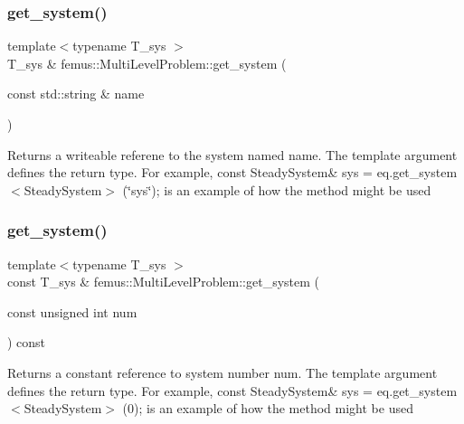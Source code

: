 \subsubsection{\texorpdfstring{get\+\_\+system()}{get\_system()}\hspace{0.1cm}{\footnotesize\ttfamily [2/8]}}
{\footnotesize\ttfamily template$<$typename T\+\_\+sys $>$ \\
T\+\_\+sys \& femus\+::\+Multi\+Level\+Problem\+::get\+\_\+system (\begin{DoxyParamCaption}\item[{const std\+::string \&}]{name }\end{DoxyParamCaption})\hspace{0.3cm}{\ttfamily [inline]}}

\begin{DoxyReturn}{Returns}
a writeable referene to the system named {\ttfamily name}. The template argument defines the return type. For example, const Steady\+System\& sys = eq.\+get\+\_\+system$<$\+Steady\+System$>$ (\char`\"{}sys\char`\"{}); is an example of how the method might be used 
\end{DoxyReturn}
\mbox{\label{classfemus_1_1_multi_level_problem_a9a964b09c5762cc0d7c3569385126b4a}} 
\subsubsection{\texorpdfstring{get\+\_\+system()}{get\_system()}\hspace{0.1cm}{\footnotesize\ttfamily [3/8]}}
{\footnotesize\ttfamily template$<$typename T\+\_\+sys $>$ \\
const T\+\_\+sys \& femus\+::\+Multi\+Level\+Problem\+::get\+\_\+system (\begin{DoxyParamCaption}\item[{const unsigned int}]{num }\end{DoxyParamCaption}) const\hspace{0.3cm}{\ttfamily [inline]}}

\begin{DoxyReturn}{Returns}
a constant reference to system number {\ttfamily num}. The template argument defines the return type. For example, const Steady\+System\& sys = eq.\+get\+\_\+system$<$\+Steady\+System$>$ (0); is an example of how the method might be used 
\end{DoxyReturn}
\mbox{\label{classfemus_1_1_multi_level_problem_ae2ead158185a53358bb5f5bd84d4f267}} 
